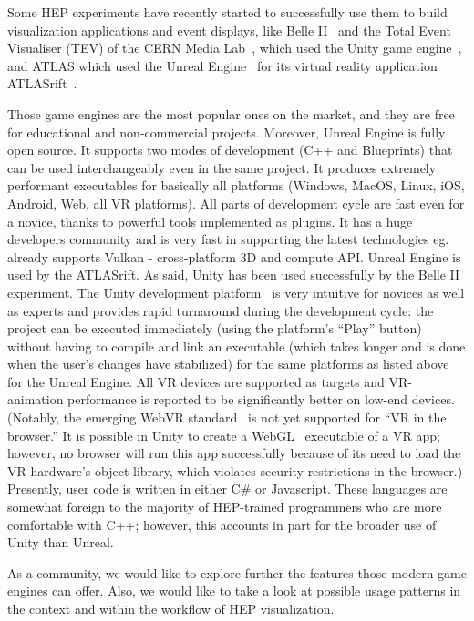 \documentclass[12pt,a4paper]{article}
\begin{document}
Some HEP experiments have recently started to successfully use them to build visualization applications and event displays,
like Belle II~\cite{BelleIIVR} and the Total Event Visualiser (TEV) of the CERN Media Lab~\cite{CERNTEV}, which used the Unity
game engine~\cite{Unity3D}, and ATLAS which used the Unreal Engine~\cite{EpicUnreal} for its virtual reality application
ATLASrift~\cite{ATLASRift}.

Those game engines are the most popular ones on the market, and they are free for educational and non-commercial projects.
Moreover, Unreal Engine is fully open source. It supports two modes of development (C++ and Blueprints) that can be used
interchangeably even in the same project. It produces extremely performant executables for basically all platforms
(Windows, MacOS, Linux, iOS, Android, Web, all VR platforms). All parts of development cycle are fast even for a novice,
thanks to powerful tools implemented as plugins. It has a huge developers community and is very fast in supporting the
latest technologies eg. already supports Vulkan - cross-platform 3D and compute API. Unreal Engine is used by the ATLASrift.
As said, Unity has been used successfully by the Belle II experiment. The Unity development platform~\cite{Unity3D} is very
intuitive for novices as well as experts and provides rapid turnaround during the development cycle: the project can be
executed immediately (using the platform’s “Play” button) without having to compile and link an executable (which takes
longer and is done when the user’s changes have stabilized) for the same platforms as listed above for the Unreal Engine.
All VR devices are supported as targets and VR-animation performance is reported to be significantly better on low-end devices.
(Notably, the emerging WebVR standard~\cite{WebVR} is not yet supported for “VR in the browser.” It is possible in Unity to create a
WebGL~\cite{WebGL2011} executable of a VR app; however, no browser will run this app successfully because of its need to load the
VR-hardware’s object library, which violates security restrictions in the browser.) Presently, user code is written in either
C\# or Javascript. These languages are somewhat foreign to the majority of HEP-trained programmers who are more comfortable with
C++; however, this accounts in part for the broader use of Unity than Unreal.

As a community, we would like to explore further the features those modern game engines can offer. Also, we would like to take a
look at possible usage patterns in the context and within the workflow of HEP visualization.
\end{document}
